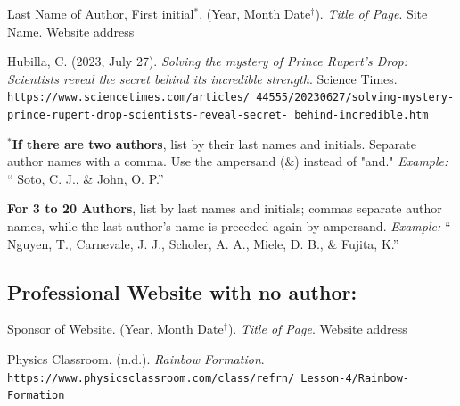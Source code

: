 \documentclass[10pt]{exam}
\begin{document}
\begin{mycitation}
  \color{ForestGreen} Last Name of Author, First initial$^\ast$. \color{purple} (Year, Month Date$^\dagger$). \emph{\color{red} Title of Page}. \color{black} Site Name. \color{blue} Website address
\end{mycitation}

\vspace{1em}

\begin{examplecitation}
    \raggedright
    \color{ForestGreen} Hubilla, C. \color{purple}(2023, July 27). \color{red}\emph{Solving the mystery of Prince Rupert's Drop: Scientists reveal the secret behind its incredible strength}. \color{black} Science Times.
    \color{blue} \texttt{https://www.sciencetimes.com/articles/ 44555/20230627/solving-mystery-prince-rupert-drop-scientists-reveal-secret- behind-incredible.htm}    
\end{examplecitation}

\vspace{1em}

$^\ast$\textbf{If there are two authors}, list by their last names and initials. Separate author names with a comma. Use the ampersand (\&) instead of "and." \hfill \emph{Example:} ``{\color{ForestGreen} Soto, C. J., \& John, O. P.}''

\textbf{For 3 to 20 Authors}, list by last names and initials; commas separate author names, while the last author's name is preceded again by ampersand. \hfill \emph{Example:}  ``{\color{ForestGreen} Nguyen, T., Carnevale, J. J., Scholer, A. A., Miele, D. B., \& Fujita, K.}'' 

\vspace{1em}
\subsection*{Professional Website with no author:}


\begin{mycitation}
  \color{ForestGreen} Sponsor of Website. \color{purple} (Year, Month Date$^\dagger$). \emph{\color{red} Title of Page}. \color{blue} Website address
\end{mycitation}

\vspace{1em}

\begin{examplecitation}
    \raggedright
    \color{ForestGreen} Physics Classroom. \color{purple}(n.d.). \color{red}\emph{Rainbow Formation}.
  \color{blue}\texttt{https://www.physicsclassroom.com/class/refrn/ Lesson-4/Rainbow-Formation}   
\end{examplecitation}
\end{document}
